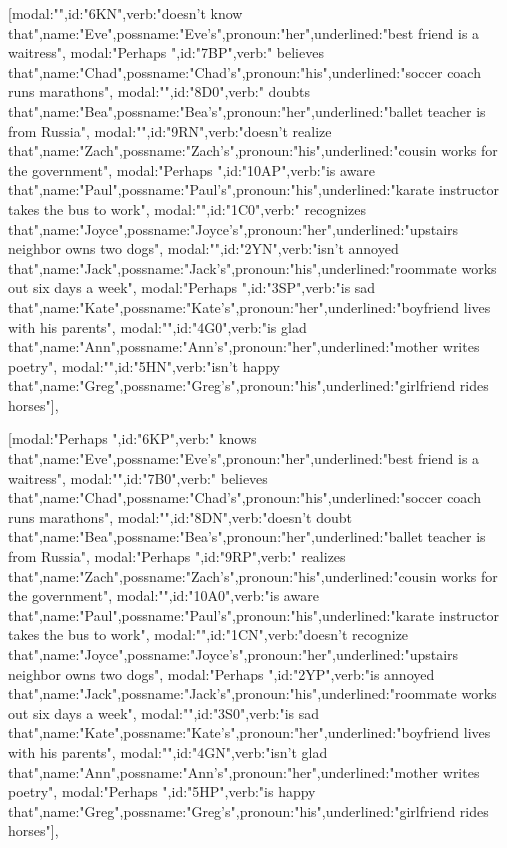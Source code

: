[{modal:"",id:"6KN",verb:"doesn't know that",name:"Eve",possname:"Eve's",pronoun:"her",underlined:"best friend is a waitress"},
{modal:"Perhaps ",id:"7BP",verb:" believes that",name:"Chad",possname:"Chad's",pronoun:"his",underlined:"soccer coach runs marathons"},
{modal:"",id:"8D0",verb:" doubts that",name:"Bea",possname:"Bea's",pronoun:"her",underlined:"ballet teacher is from Russia"},
{modal:"",id:"9RN",verb:"doesn't realize that",name:"Zach",possname:"Zach's",pronoun:"his",underlined:"cousin works for the government"},
{modal:"Perhaps ",id:"10AP",verb:"is aware that",name:"Paul",possname:"Paul's",pronoun:"his",underlined:"karate instructor takes the bus to work"},
{modal:"",id:"1C0",verb:" recognizes that",name:"Joyce",possname:"Joyce's",pronoun:"her",underlined:"upstairs neighbor owns two dogs"},
{modal:"",id:"2YN",verb:"isn't annoyed that",name:"Jack",possname:"Jack's",pronoun:"his",underlined:"roommate works out six days a week"},
{modal:"Perhaps ",id:"3SP",verb:"is sad that",name:"Kate",possname:"Kate's",pronoun:"her",underlined:"boyfriend lives with his parents"},
{modal:"",id:"4G0",verb:"is glad that",name:"Ann",possname:"Ann's",pronoun:"her",underlined:"mother writes poetry"},
{modal:"",id:"5HN",verb:"isn't happy that",name:"Greg",possname:"Greg's",pronoun:"his",underlined:"girlfriend rides horses"}],

[{modal:"Perhaps ",id:"6KP",verb:" knows that",name:"Eve",possname:"Eve's",pronoun:"her",underlined:"best friend is a waitress"},
{modal:"",id:"7B0",verb:" believes that",name:"Chad",possname:"Chad's",pronoun:"his",underlined:"soccer coach runs marathons"},
{modal:"",id:"8DN",verb:"doesn't doubt that",name:"Bea",possname:"Bea's",pronoun:"her",underlined:"ballet teacher is from Russia"},
{modal:"Perhaps ",id:"9RP",verb:" realizes that",name:"Zach",possname:"Zach's",pronoun:"his",underlined:"cousin works for the government"},
{modal:"",id:"10A0",verb:"is aware that",name:"Paul",possname:"Paul's",pronoun:"his",underlined:"karate instructor takes the bus to work"},
{modal:"",id:"1CN",verb:"doesn't recognize that",name:"Joyce",possname:"Joyce's",pronoun:"her",underlined:"upstairs neighbor owns two dogs"},
{modal:"Perhaps ",id:"2YP",verb:"is annoyed that",name:"Jack",possname:"Jack's",pronoun:"his",underlined:"roommate works out six days a week"},
{modal:"",id:"3S0",verb:"is sad that",name:"Kate",possname:"Kate's",pronoun:"her",underlined:"boyfriend lives with his parents"},
{modal:"",id:"4GN",verb:"isn't glad that",name:"Ann",possname:"Ann's",pronoun:"her",underlined:"mother writes poetry"},
{modal:"Perhaps ",id:"5HP",verb:"is happy that",name:"Greg",possname:"Greg's",pronoun:"his",underlined:"girlfriend rides horses"}],

